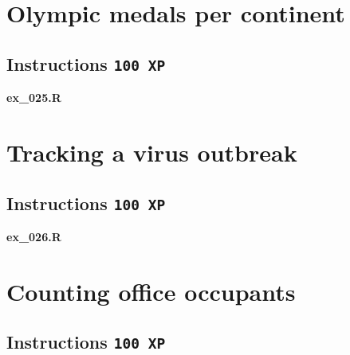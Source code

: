 \documentclass[
  letterpaper,
  DIV=11,
  numbers=noendperiod]{scrreprt}
\newenvironment{Shaded}{\begin{snugshade}}{\end{snugshade}}
\begin{document}
\hypertarget{olympic-medals-per-continent}{%
\section{Olympic medals per
continent}\label{olympic-medals-per-continent}}

\hypertarget{instructions-100-xp-22}{%
\subsection*{\texorpdfstring{Instructions
\texttt{100\ XP}}{Instructions 100 XP}}\label{instructions-100-xp-22}}

\textbf{ex\_025.R}

\begin{Shaded}
\begin{Highlighting}[]

\end{Highlighting}
\end{Shaded}

\hypertarget{tracking-a-virus-outbreak}{%
\section{Tracking a virus outbreak}\label{tracking-a-virus-outbreak}}

\hypertarget{instructions-100-xp-23}{%
\subsection*{\texorpdfstring{Instructions
\texttt{100\ XP}}{Instructions 100 XP}}\label{instructions-100-xp-23}}

\textbf{ex\_026.R}

\begin{Shaded}
\begin{Highlighting}[]

\end{Highlighting}
\end{Shaded}

\hypertarget{counting-office-occupants}{%
\section{Counting office occupants}\label{counting-office-occupants}}

\hypertarget{instructions-100-xp-24}{%
\subsection*{\texorpdfstring{Instructions
\texttt{100\ XP}}{Instructions 100 XP}}\label{instructions-100-xp-24}}
\end{document}

